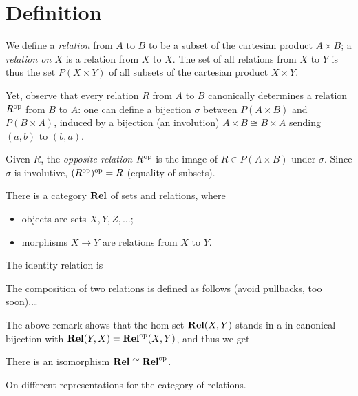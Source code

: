 
\section{Definition}
We define a \emph{relation} from $A$ to $B$ to be a subset of the cartesian product $A\times B$; a \emph{relation on $X$} is a relation from $X$ to $X$. The set of all relations from $X$ to $Y$ is thus the set $P(X\times Y)$ of all subsets of the cartesian product $X\times Y$.

Yet, observe that every relation $R$ from $A$ to $B$ canonically determines a relation $R^{\text{op}}$ from $B$ to $A$: one can define a bijection \(\sigma\) between \(P(A\times B)\) and \(P(B\times A)\), induced by a bijection (an involution) \(A\times B \cong B\times A\) sending $(a,b)$ to $(b,a)$.

Given $R$, the \emph{opposite relation} \(R^{\text{op}}\) is the image of \(R\in P(A\times B)\) under \(\sigma\). Since $\sigma$ is involutive, $(R^{\text{op}})^{\text{op}} = R$ (equality of subsets).

There is a category $\mathbf{Rel}$ of sets and relations, where
\begin{itemize}
  \item objects are sets $X,Y,Z,\dots$;
  \item morphisms $X \to Y$ are relations from $X$ to $Y$.
\end{itemize}
The identity relation is\tba

The composition of two relations is defined as follows \tba (avoid pullbacks, too soon).\dots

The above remark shows that the hom set $\mathbf{Rel}(X,Y)$ stands in a in canonical bijection with $\mathbf{Rel}(Y,X) = \mathbf{Rel}^{\text{op}}(X,Y)$, and thus we get
\begin{proposition}
There is an isomorphism $\mathbf{Rel}\cong \mathbf{Rel}^{\text{op}}$.\tba
\end{proposition}
On different representations for the category of relations.\tba


